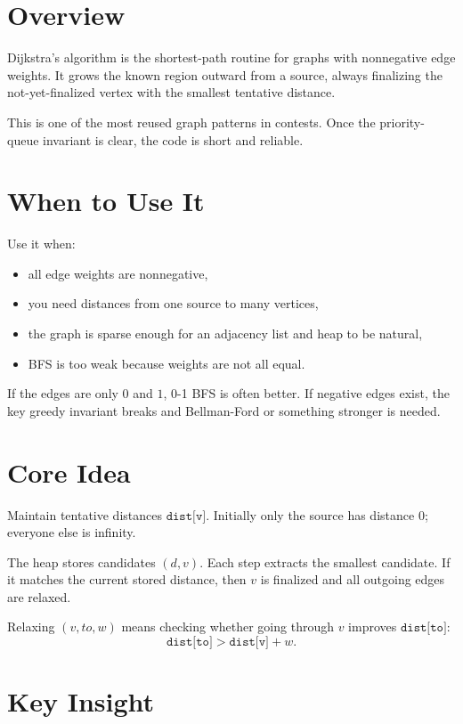 \section*{Overview}

Dijkstra's algorithm is the shortest-path routine for graphs with nonnegative edge weights. It grows the known region
outward from a source, always finalizing the not-yet-finalized vertex with the smallest tentative distance.

This is one of the most reused graph patterns in contests. Once the priority-queue invariant is clear, the code is
short and reliable.

\section*{When to Use It}

Use it when:

\begin{itemize}
  \item all edge weights are nonnegative,
  \item you need distances from one source to many vertices,
  \item the graph is sparse enough for an adjacency list and heap to be natural,
  \item BFS is too weak because weights are not all equal.
\end{itemize}

If the edges are only \(0\) and \(1\), 0-1 BFS is often better. If negative edges exist, the key greedy invariant
breaks and Bellman-Ford or something stronger is needed.

\section*{Core Idea}

Maintain tentative distances \(\texttt{dist[v]}\). Initially only the source has distance \(0\); everyone else is
infinity.

The heap stores candidates \((d, v)\). Each step extracts the smallest candidate. If it matches the current stored
distance, then \(v\) is finalized and all outgoing edges are relaxed.

Relaxing \((v, to, w)\) means checking whether going through \(v\) improves \(\texttt{dist[to]}\):
\[
\texttt{dist[to]} > \texttt{dist[v]} + w.
\]

\section*{Key Insight}

